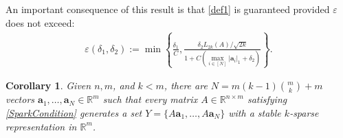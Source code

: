 \documentclass[journal, twocolumn]{IEEEtran}
\newtheorem{corollary}{Corollary}
\newtheorem{remark}{Remark}
\begin{document}


 
An important consequence of this result is that \eqref{def1} is guaranteed provided $\varepsilon$ does not exceed:
\begin{align*}
\varepsilon(\delta_1, \delta_2) := \min \left\{ \frac{\delta_1}{ C }, \frac{ \delta_2 L_{2k}(A) / \sqrt{2k}}{ 1 + C \left( \max_{i \in [N]} |\mathbf{a}_i|_1  + \delta_2 \right) } \right\}.
\end{align*}


%



\begin{corollary}\label{DeterministicUniquenessCorollary}
Given $n, m$, and $k < m$, there are $N =  m(k-1){m \choose k}+m$ vectors \mbox{$\mathbf{a}_1, \ldots, \mathbf{a}_N \in \mathbb{R}^m$} such that every matrix $A \in \mathbb{R}^{n \times m}$ satisfying \eqref{SparkCondition} generates a set $Y = \{A\mathbf{a}_1, \ldots, A\mathbf{a}_N\}$ with a stable $k$-sparse representation in $\mathbb R^m$.
\end{corollary}
\end{document}
